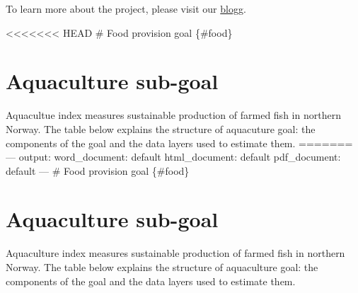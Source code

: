 \documentclass[
]{book}
\begin{document}
To learn more about the project, please visit our \href{https://markdownmonster.west-wind.com/docs/_4xs10gaui.htm}{blogg}.

\textless\textless\textless\textless\textless\textless\textless{} HEAD
\# Food provision goal \{\#food\}

\hypertarget{aquaculture-sub-goal}{%
\section{Aquaculture sub-goal}\label{aquaculture-sub-goal}}

Aquacultue index measures sustainable production of farmed fish in northern Norway.
The table below explains the structure of aquacuture goal: the components of the goal and the data layers used to estimate them.
=======
---
output:
word\_document: default
html\_document: default
pdf\_document: default
---
\# Food provision goal \{\#food\}

\hypertarget{aquaculture-sub-goal-1}{%
\section{Aquaculture sub-goal}\label{aquaculture-sub-goal-1}}

Aquaculture index measures sustainable production of farmed fish in northern Norway.
The table below explains the structure of aquaculture goal: the components of the goal and the data layers used to estimate them.
\end{document}
